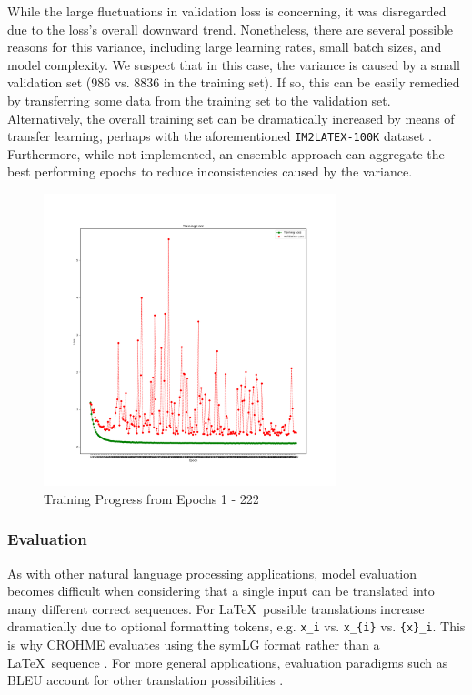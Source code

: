 While the large fluctuations in validation loss is concerning, it was disregarded due to the loss's overall downward trend. Nonetheless, there are several possible reasons for this variance, including large learning rates, small batch sizes, and model complexity. We suspect that in this case, the variance is caused by a small validation set (986 vs. 8836 in the training set). If so, this can be easily remedied by transferring some data from the training set to the validation set. Alternatively, the overall training set can be dramatically increased by means of transfer learning, perhaps with the aforementioned {\tt IM2LATEX-100K} dataset \cite{im2latex}. Furthermore, while not implemented, an ensemble approach can aggregate the best performing epochs to reduce inconsistencies caused by the variance.

\begin{figure}[h!]
    \centering
    \includegraphics[width=8.5cm]{images/progress_epoch_1_222.png}
    \caption{Training Progress from Epochs 1 - 222}
    \label{fig:epoch1}
\end{figure}

\subsubsection{Evaluation} \label{sec:eval}
As with other natural language processing applications, model evaluation becomes difficult when considering that a single input can be translated into many different correct sequences. For \LaTeX\, possible translations increase dramatically due to optional formatting tokens, e.g. \verb|x_i| vs. \verb|x_{i}| vs. \verb|{x}_i|. This is why CROHME evaluates using the symLG format rather than a \LaTeX\ sequence \cite{CROHME}. For more general applications, evaluation paradigms such as BLEU account for other translation possibilities \cite{BLEU}. 

